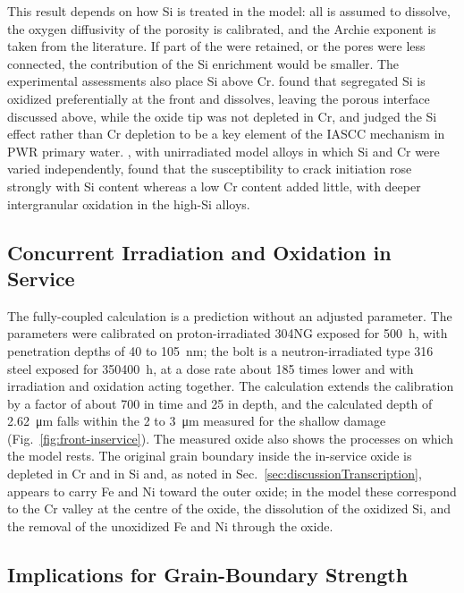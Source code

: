 \documentclass[3p,times,nonatbib]{elsarticle} %
\begin{document}
This result depends on how Si is treated in the model: all  is
assumed to dissolve, the oxygen diffusivity
of the porosity is calibrated, and the Archie exponent is taken from the
literature. If part of the  were retained, or the pores were less
connected, the contribution of the Si enrichment would be smaller. The
experimental assessments also place Si above Cr.
\textcite{kuang2022highresolution} found that segregated Si is oxidized
preferentially at the front and dissolves, leaving the porous interface
discussed above, while the oxide tip was not depleted in Cr, and judged the
Si effect rather than Cr depletion to be a key element of the IASCC
mechanism in PWR primary water. \textcite{du2026silicon}, with unirradiated
model alloys in which Si and Cr were varied independently, found that the
susceptibility to crack initiation rose strongly with Si content whereas a
low Cr content added little, with deeper intergranular oxidation in the
high-Si alloys.

\subsection{Concurrent Irradiation and Oxidation in Service}
\label{sec:discussionInService}

The fully-coupled calculation is a prediction without an adjusted parameter.
The parameters were calibrated on proton-irradiated 304NG exposed for
\SI{500}{h}, with penetration depths of 40 to \SI{105}{nm}; the bolt is a
neutron-irradiated type 316 steel exposed for \SI{350400}{h}, at a dose rate
about 185 times lower and with irradiation and oxidation acting together.
The calculation extends the calibration by a factor of about 700 in time and
25 in depth, and the calculated depth of \SI{2.62}{\micro\metre} falls within
the 2 to \SI{3}{\micro\metre} measured for the shallow damage
(Fig.~\ref{fig:front-inservice}). The measured oxide also shows the
processes on which the model rests. The original grain boundary inside the
in-service oxide is depleted in Cr and in Si \cite{lach2025inservice}
and, as noted in Sec.~\ref{sec:discussionTranscription}, appears to carry Fe
and Ni toward the outer oxide; in the model these correspond to the Cr valley
at the centre of the oxide, the dissolution of the oxidized Si, and the
removal of the unoxidized Fe and Ni through the oxide.

\subsection{Implications for Grain-Boundary Strength}
\label{sec:discussionStrength}
\end{document}
